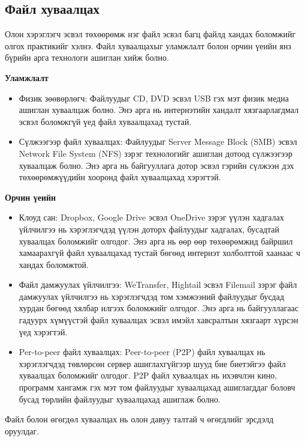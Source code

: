 \subsection{Файл хуваалцах}
Олон хэрэглэгч эсвэл төхөөрөмж нэг файл эсвэл багц файлд хандах боломжийг олгох практикийг хэлнэ. Файл хуваалцахыг уламжлалт болон орчин үеийн янз бүрийн арга технологи ашиглан хийж болно.

\textbf{Уламжлалт}
\begin{itemize}
    \item Физик зөөвөрлөгч: Файлуудыг CD, DVD эсвэл USB гэх мэт физик медиа ашиглан хуваалцаж болно. Энэ арга нь интернэтийн хандалт хязгаарлагдмал эсвэл боломжгүй үед файл хуваалцахад тустай.
    \item Сүлжээгээр файл хуваалцах: Файлуудыг Server Message Block (SMB) эсвэл Network File System (NFS) зэрэг технологийг ашиглан дотоод сүлжээгээр хуваалцаж болно. Энэ арга нь байгууллага дотор эсвэл гэрийн сүлжээн дэх төхөөрөмжүүдийн хооронд файл хуваалцахад хэрэгтэй.
\end{itemize}

\textbf{Орчин үеийн}
\begin{itemize}
    \item Клоуд сан: Dropbox, Google Drive эсвэл OneDrive зэрэг үүлэн хадгалах үйлчилгээ нь хэрэглэгчдэд үүлэн доторх файлуудыг хадгалах, бусадтай хуваалцах боломжийг олгодог. Энэ арга нь өөр өөр төхөөрөмжид байршил хамаарахгүй файл хуваалцахад тустай бөгөөд интернэт холболттой хаанаас ч хандах боломжтой.
    \item Файл дамжуулах үйлчилгээ: WeTransfer, Hightail эсвэл Filemail зэрэг файл дамжуулах үйлчилгээ нь хэрэглэгчдэд том хэмжээний файлуудыг бусдад хурдан бөгөөд хялбар илгээх боломжийг олгодог. Энэ арга нь байгууллагаас гадуурх хүмүүстэй файл хуваалцах эсвэл имэйл хавсралтын хязгаарт хүрсэн үед хэрэгтэй.
    \item Per-to-peer файл хуваалцах: Peer-to-peer (P2P) файл хуваалцах нь хэрэглэгчдэд төвлөрсөн сервер ашиглахгүйгээр шууд бие биетэйгээ файл хуваалцах боломжийг олгодог. P2P файл хуваалцах нь ихэвчлэн кино, программ хангамж гэх мэт том файлуудыг хуваалцахад ашиглагддаг боловч бусад төрлийн файлуудыг хуваалцахад ашиглаж болно.
\end{itemize}
Файл болон өгөгдөл хуваалцах нь олон давуу талтай ч өгөгдлийг эрсдэлд оруулдаг.

